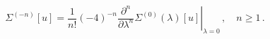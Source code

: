\begin{equation*}
\Sigma^{(-n)}[u] = \left.\frac{1}{{n}!}(-4)^{-{n}}
\frac{\partial^{{n}}}{\partial\lambda^{{n}}}
\Sigma^{(0)}(\lambda)[u]\right|_{\lambda=0}\,,\quad {n} \geq 1\,.
\end{equation*}

